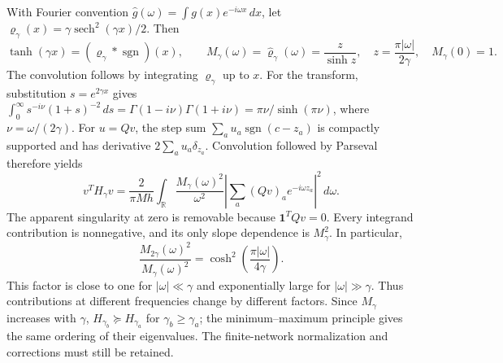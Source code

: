 With Fourier convention $\widehat g(\omega)=\int g(x)e^{-i\omega x}\,dx$,
let $\varrho_\gamma(x)=\gamma\operatorname{sech}^2(\gamma x)/2$. Then
\begin{equation}
 \tanh(\gamma x)=(\varrho_\gamma*\operatorname{sgn})(x),\qquad
 M_\gamma(\omega)=\widehat\varrho_\gamma(\omega)
 =\frac{z}{\sinh z},\quad z=\frac{\pi|\omega|}{2\gamma},\quad M_\gamma(0)=1.
 \label{eq:note-multiplier}
\end{equation}
The convolution follows by integrating $\varrho_\gamma$ up to $x$.
For the transform, substitution $s=e^{2\gamma x}$ gives
$\int_0^\infty s^{-i\nu}(1+s)^{-2}\,ds
=\Gamma(1-i\nu)\Gamma(1+i\nu)=\pi\nu/\sinh(\pi\nu)$,
where $\nu=\omega/(2\gamma)$.
For $u=Qv$, the step sum $\sum_a u_a\operatorname{sgn}(c-z_a)$ is
compactly supported and has derivative $2\sum_a u_a\delta_{z_a}$.
Convolution followed by Parseval therefore yields
\begin{equation}
 v^TH_\gamma v=\frac2{\pi Mh}\int_{\mathbb R}
 \frac{M_\gamma(\omega)^2}{\omega^2}
 \left|\sum_a(Qv)_a e^{-i\omega z_a}\right|^2\,d\omega.
 \label{eq:note-fourier-quadratic}
\end{equation}
The apparent singularity at zero is removable because $\mathbf1^TQv=0$.
Every integrand contribution is nonnegative, and its only slope dependence
is $M_\gamma^2$. In particular,
\begin{equation}
 \frac{M_{2\gamma}(\omega)^2}{M_\gamma(\omega)^2}
 =\cosh^2\!\left(\frac{\pi|\omega|}{4\gamma}\right).
 \label{eq:note-multiplier-gain}
\end{equation}
This factor is close to one for $|\omega|\ll\gamma$ and exponentially
large for $|\omega|\gg\gamma$. Thus contributions at different frequencies
change by different factors. Since $M_\gamma$ increases with $\gamma$,
$H_{\gamma_b}\succeq H_{\gamma_a}$ for $\gamma_b\ge\gamma_a$;
the minimum--maximum principle gives the same ordering of their eigenvalues.
The finite-network normalization and corrections must still be retained.

